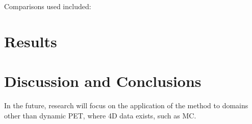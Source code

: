         Comparisons used included: 


\section{Results} \label{sec:results}
        
        
        
        
        
        
    
    


\section{Discussion and Conclusions} \label{sec:discussion_and_conclusions}
    
    
    In the future, research will focus on the application of the method to domains other than dynamic \gls{PET}, where \gls{4D} data exists, such as \gls{MC}.